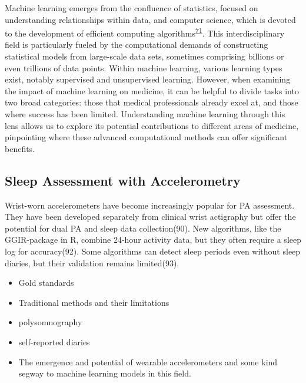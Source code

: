 \documentclass[
  9pt,
]{scrbook}
\providecommand{\tightlist}{%
  \setlength{\itemsep}{0pt}\setlength{\parskip}{0pt}}\usepackage{longtable,booktabs,array}
\begin{document}
Machine learning emerges from the confluence of statistics, focused on
understanding relationships within data, and computer science, which is
devoted to the development of efficient computing
algorithms\textsuperscript{\protect\hyperlink{ref-hastie01statisticallearning}{71}}.
This interdisciplinary field is particularly fueled by the computational
demands of constructing statistical models from large-scale data sets,
sometimes comprising billions or even trillions of data points. Within
machine learning, various learning types exist, notably supervised and
unsupervised learning. However, when examining the impact of machine
learning on medicine, it can be helpful to divide tasks into two broad
categories: those that medical professionals already excel at, and those
where success has been limited. Understanding machine learning through
this lens allows us to explore its potential contributions to different
areas of medicine, pinpointing where these advanced computational
methods can offer significant benefits.

\hypertarget{sleep-assessment-with-accelerometry}{%
\subsection{Sleep Assessment with
Accelerometry}\label{sleep-assessment-with-accelerometry}}

Wrist-worn accelerometers have become increasingly popular for PA
assessment. They have been developed separately from clinical wrist
actigraphy but offer the potential for dual PA and sleep data
collection(90). New algorithms, like the GGIR-package in R, combine
24-hour activity data, but they often require a sleep log for
accuracy(92). Some algorithms can detect sleep periods even without
sleep diaries, but their validation remains limited(93).

\begin{itemize}
\tightlist
\item
  Gold standards
\item
  Traditional methods and their limitations
\item
  polysomnography
\item
  self-reported diaries
\item
  The emergence and potential of wearable accelerometers and some kind
  segway to machine learning models in this field.
\end{itemize}
\end{document}
